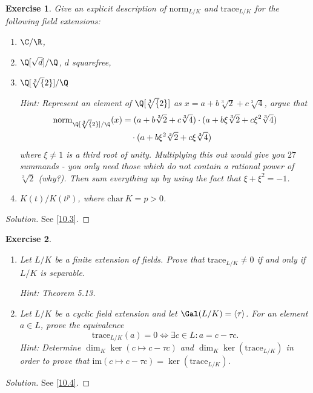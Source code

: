 \documentclass[a4paper,10pt,reqno]{amsart}
\newtheorem{ex}{Exercise}[section]
\newenvironment{sol}
  {\renewcommand\qedsymbol{$\blacksquare$}\begin{proof}[Solution]}
  {\end{proof}}
\begin{document}
\begin{ex}
\label{9.3}
    Give an explicit description of $\mathrm{norm}_{L/K}$ and $\mathrm{trace}_{L/K}$ for the following field extensions:
    \begin{enumerate}[label=(\roman*)]
        \item $\C/\R$,
        \item $\Q[\sqrt{d}]/\Q$, $d$ squarefree,
        \item $\Q[\sqrt[3]{2}]/\Q$

        \noindent \textit{Hint:} Represent an element of $\Q[\sqrt[3]{2}]$ as $x = a + b \sqrt[3]{2} + c \sqrt[3]{4}$, argue that
        \begin{align*}
        \mathrm{norm}_{\Q[\sqrt[3]{2}]/\Q}(x) & = (a + b \sqrt[3]{2} + c \sqrt[3]{4}) \cdot (a + b\xi \sqrt[3]{2} + c\xi^2 \sqrt[3]{4}) \\
        & \quad \cdot (a + b\xi^2 \sqrt[3]{2} + c \xi\sqrt[3]{4})
        \end{align*}
        where $\xi \neq 1$ is a third root of unity. Multiplying this out would give you $27$ summands - you only need those which do not contain a rational power of $\sqrt[3]{2}$ (why?). Then sum everything up by using the fact that $\xi + \xi^2 = -1$.
        \item $K(t)/K(t^p)$, where $\mathrm{char}\ K = p > 0$.
    \end{enumerate}
\end{ex}
\begin{sol}
    See \cref{10.3}.
\end{sol}

\begin{ex}
\label{9.4}~

    \begin{enumerate}[label=(\roman*)]
        \item Let $L/K$ be a finite extension of fields. Prove that $\mathrm{trace}_{L/K} \neq 0$ if and only if $L/K$ is separable.

    \noindent \textit{Hint:} Theorem 5.13.
        \item Let $L/K$ be a cyclic field extension and let $\Gal(L/K) = \left\langle \tau \right\rangle$. For an element $a \in L$, prove the equivalence
        \[
        \mathrm{trace}_{L/K}(a)=0 \Leftrightarrow \exists c \in L: a = c - \tau c.
        \]
        \noindent \textit{Hint:} Determine $\dim_K \ker (c \mapsto c- \tau c)$ and $\dim_K \ker (\mathrm{trace}_{L/K})$ in order to prove that $\mathrm{im}(c \mapsto c - \tau c) = \ker (\mathrm{trace}_{L/K})$.
    \end{enumerate}
\end{ex}
\begin{sol}
    See \cref{10.4}.
\end{sol}
\end{document}
